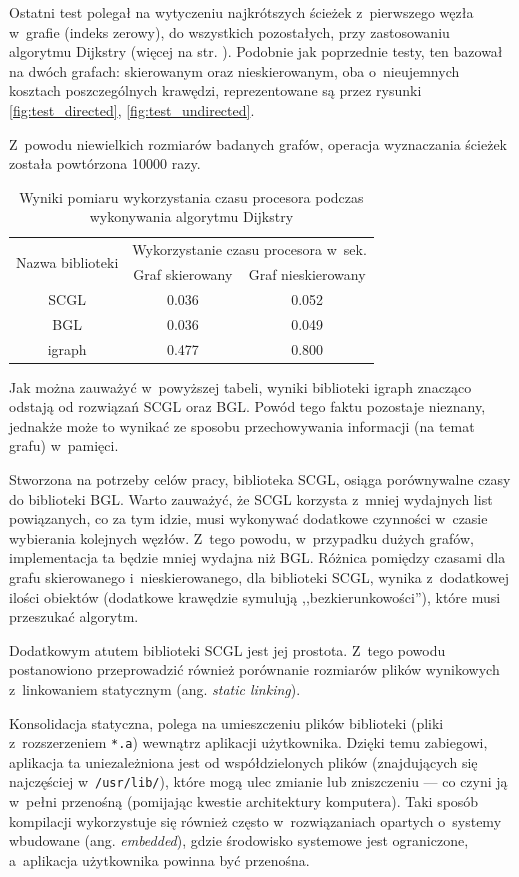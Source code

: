 \documentclass[a4paper,12pt,polish,twoside,openright]{thesis}
\newcommand\code[1]{\lstinline[style=line]{#1}}
\begin{document}
Ostatni test polegał na wytyczeniu najkrótszych ścieżek z~pierwszego węzła w~grafie (indeks zerowy), do wszystkich pozostałych, przy zastosowaniu algorytmu Dijkstry (więcej na str. \pageref{chap:dijkstra}).
Podobnie jak poprzednie testy, ten bazował na dwóch grafach: skierowanym oraz nieskierowanym, oba o~nieujemnych kosztach poszczególnych krawędzi, reprezentowane są przez rysunki \ref{fig:test_directed}, \ref{fig:test_undirected}.

Z~powodu niewielkich rozmiarów badanych grafów, operacja wyznaczania ścieżek została powtórzona 10000 razy.

\begin{table}[htb]
\caption{Wyniki pomiaru wykorzystania czasu procesora podczas wykonywania algorytmu Dijkstry}
\label{tab:dijkstra}
\centering
\begin{tabular}{ | c | c | c | }
	\hline
	\multirow{2}{*}{Nazwa biblioteki } & \multicolumn{2}{|c|}{Wykorzystanie czasu procesora w~sek.} \\
	\cline{2-3}
		& Graf skierowany & Graf nieskierowany \\
	\hline \hline
	SCGL    & 0.036 & 0.052 \\ \hline
	BGL     & 0.036 & 0.049 \\ \hline
	igraph  & 0.477 & 0.800 \\ \hline
\end{tabular}
\end{table}
Jak można zauważyć w~powyższej tabeli, wyniki biblioteki igraph znacząco odstają od rozwiązań SCGL oraz BGL.
Powód tego faktu pozostaje nieznany, jednakże może to wynikać ze sposobu przechowywania informacji (na temat grafu) w~pamięci.

Stworzona na potrzeby celów pracy, biblioteka SCGL, osiąga porównywalne czasy do biblioteki BGL.
Warto zauważyć, że SCGL korzysta z~mniej wydajnych list powiązanych, co za tym idzie, musi wykonywać dodatkowe czynności w~czasie wybierania kolejnych węzłów.
Z~tego powodu, w~przypadku dużych grafów, implementacja ta będzie mniej wydajna niż BGL.
Różnica pomiędzy czasami dla grafu skierowanego i~nieskierowanego, dla biblioteki SCGL, wynika z~dodatkowej ilości obiektów (dodatkowe krawędzie symulują ,,bezkierunkowości''), które musi przeszukać algorytm.

Dodatkowym atutem biblioteki SCGL jest jej prostota.
Z~tego powodu postanowiono przeprowadzić również porównanie rozmiarów plików wynikowych z~linkowaniem statycznym (ang. \emph{static linking}).

Konsolidacja statyczna, polega na umieszczeniu plików biblioteki (pliki z~rozszerzeniem \code{*.a}) wewnątrz aplikacji użytkownika.
Dzięki temu zabiegowi, aplikacja ta uniezależniona jest od współdzielonych plików (znajdujących się najczęściej w~\code{/usr/lib/}), które mogą ulec zmianie lub zniszczeniu --- co czyni ją w~pełni przenośną (pomijając kwestie architektury komputera).
Taki sposób kompilacji wykorzystuje się również często w~rozwiązaniach opartych o~systemy wbudowane (ang. \emph{embedded}), gdzie środowisko systemowe jest ograniczone, a~aplikacja użytkownika powinna być przenośna.
\end{document}
